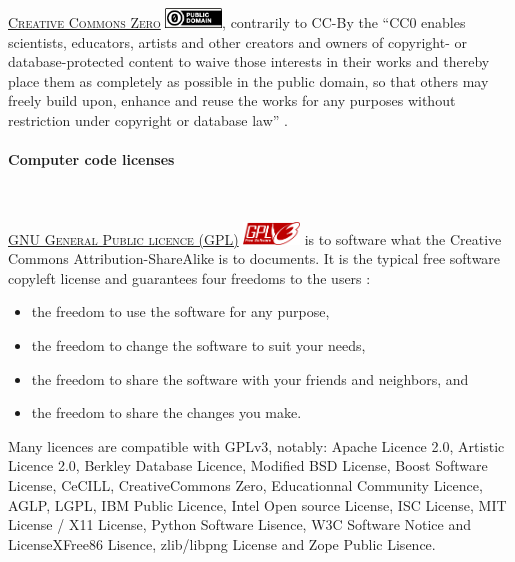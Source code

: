 \vspace{0.4cm}

\noindent \label{lcc0}  \textsc{\href{https://creativecommons.org/}{Creative Commons Zero}} \includegraphics[width=15mm]{./images/CC0-88x31.png}, contrarily to CC-By the ``CC0 enables scientists, educators, artists and other creators and owners of copyright- or database-protected content to waive those interests in their works and thereby place them as completely as possible in the public domain, so that others may freely build upon, enhance and reuse the works for any purposes without restriction under copyright or database law'' \cite{creativecommons.org_creative_2015}.

\paragraph{Computer code licenses}

~

\noindent {} \textsc{\href{http://www.gnu.org/licenses/gpl.html}{GNU General Public licence (GPL)}} \includegraphics[width=15mm]{./images/gplv3-127x51.png} is to software what the Creative Commons Attribution-ShareAlike is to documents. It is the typical free software copyleft license and guarantees four freedoms to the users \cite{fsf_gpl_2105}:
\begin{itemize}
\item the freedom to use the software for any purpose,
\item the freedom to change the software to suit your needs,
\item the freedom to share the software with your friends and neighbors, and
\item the freedom to share the changes you make.
\end{itemize}

Many licences are compatible with GPLv3, notably: Apache Licence 2.0, Artistic Licence 2.0, Berkley Database Licence, Modified BSD License, Boost Software License, CeCILL, CreativeCommons Zero, Educationnal Community Licence, AGLP, LGPL, IBM Public Licence, Intel Open source License, ISC License, MIT License / X11 License, Python Software Lisence, W3C Software Notice and LicenseXFree86 Lisence, zlib/libpng License and Zope Public Lisence.  \cite{wikipedia_comparison_2015}

